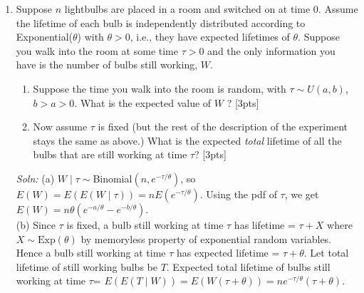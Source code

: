 \documentclass[12pt]{article}
\begin{document}
\begin{enumerate}
\item Suppose $n$ lightbulbs are placed in a room and switched on at
  time $0$. Assume the lifetime of each bulb is independently
  distributed according to Exponential($\theta$) with $\theta>0$, i.e., they have
 expected lifetimes of $\theta$. Suppose you walk into the room at some time
  $\tau > 0 $ and the only information you have is the number of bulbs
  still working, $W$.
\begin{enumerate}
\item Suppose the time you walk into the room is random, with $\tau \sim U(a,b)$, $b > a >0$. What is the expected value of $W$ ? [3pts]
\item Now assume $\tau$ is fixed (but the rest of the description of
  the experiment stays the same as above.) What is the expected {\it total}
  lifetime of all the bulbs that are still working at time $\tau$?
  [3pts]
\end{enumerate}
{\it Soln:} (a) $W \mid \tau \sim$Binomial$(n,e^{-\tau/\theta})$, so $E(W)=  E(E(W\mid \tau)) = n E(e^{-\tau/\theta}) $. Using the pdf of $\tau$, we get $E(W) = n \theta(e^{-a/\theta} - e^{-b/\theta}).$\\
(b) Since $\tau$ is fixed, a bulb still working at time $\tau$ has
lifetime = $\tau + X $ where $X\sim \mbox{Exp}(\theta)$ by memoryless
property of exponential random variables. Hence a bulb still working
at time $\tau$ has expected lifetime = $\tau + \theta $. Let total
lifetime of still working bulbs be $T$. Expected total lifetime of
bulbs still working at time $\tau$= $E(E(T\mid W)) = E(W(\tau + \theta))  = 
n e^{-\tau/\theta} (\tau + \theta)$.

\newpage


\end{enumerate}
\end{document}
